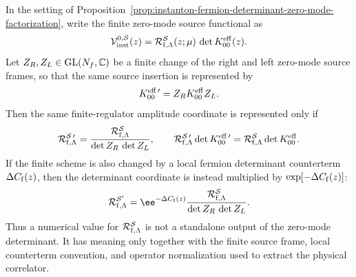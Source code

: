 \begin{proposition}
\label{prop:instanton-light-fermion-source-frame-covariance}
In the setting of
Proposition~\ref{prop:instanton-fermion-determinant-zero-mode-factorization},
write the finite zero-mode source functional as
\begin{equation}
  \mathcal V_{\rm inst}^{0,\mathcal S}(z)
  =
  \mathcal R_{{\rm f},\Lambda}^{\mathcal S}(z;\mu)\,
  \det K_{00}^{\rm eff}(z).
  \label{eq:instanton-light-fermion-source-frame-functional}
\end{equation}
Let \(Z_R,Z_L\in {\rm GL}(N_f,\mathbb C)\) be a finite change of the right and left
zero-mode source frames, so that the same source insertion is represented by
\begin{equation}
  K_{00}^{\rm eff\,\prime}=Z_RK_{00}^{\rm eff}Z_L .
  \label{eq:instanton-zero-mode-source-frame-change}
\end{equation}
Then the same finite-regulator amplitude coordinate is represented only if
\begin{equation}
  \mathcal R_{{\rm f},\Lambda}^{\mathcal S\,\prime}
  =
  \frac{\mathcal R_{{\rm f},\Lambda}^{\mathcal S}}
       {\det Z_R\,\det Z_L},
  \qquad
  \mathcal R_{{\rm f},\Lambda}^{\mathcal S\,\prime}
  \det K_{00}^{\rm eff\,\prime}
  =
  \mathcal R_{{\rm f},\Lambda}^{\mathcal S}
  \det K_{00}^{\rm eff}.
  \label{eq:instanton-light-fermion-source-frame-covariance}
\end{equation}
If the finite scheme is also changed by a local fermion determinant counterterm
\(\Delta C_{\rm f}(z)\), then the determinant coordinate is instead multiplied
by \(\exp[-\Delta C_{\rm f}(z)]\):
\begin{equation}
  \mathcal R_{{\rm f},\Lambda}^{\mathcal S'}
  =
  \ee^{-\Delta C_{\rm f}(z)}
  \frac{\mathcal R_{{\rm f},\Lambda}^{\mathcal S}}
       {\det Z_R\,\det Z_L}.
  \label{eq:instanton-light-fermion-counterterm-frame-change}
\end{equation}
Thus a numerical value for
\(\mathcal R_{{\rm f},\Lambda}^{\mathcal S}\) is not a standalone output of
the zero-mode determinant.  It has meaning only together with the finite source
frame, local counterterm convention, and operator normalization used to extract
the physical correlator.
\end{proposition}

